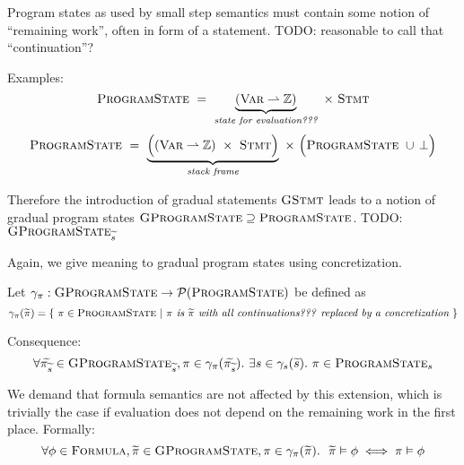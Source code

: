 Program states as used by small step semantics must contain some notion of “remaining work”, often in form of a statement.
TODO: reasonable to call that “continuation”?

Examples:
\begin{displaymath}
\textsc{ProgramState} ~=~ \underbrace{(\textsc{Var} \rightharpoonup \mathbb{Z})}_{\textit{state for evaluation???}} ~\times~ \textsc{Stmt}
\end{displaymath}
\begin{displaymath}
\textsc{ProgramState} ~=~ \underbrace{\Big((\textsc{Var} \rightharpoonup \mathbb{Z}) ~\times~ \textsc{Stmt} \Big)}_{\textit{stack frame}} ~\times~ \Big(\textsc{ProgramState} ~\cup\, \bot\Big)
\end{displaymath}

Therefore the introduction of gradual statements $\textsc{GStmt}$ leads to a notion of gradual program states $\textsc{GProgramState} \supseteq \textsc{ProgramState}$.
TODO: $\textsc{GProgramState}_{\widetilde{s}}$

Again, we give meaning to gradual program states using concretization.
\begin{definition}
    Let $\gamma_{\pi} : \textsc{GProgramState} \rightarrow \mathcal{P}(\textsc{ProgramState})$ be defined as
    \begin{displaymath}
    \gamma_{\pi}(\widetilde{\pi}) = \{~ \pi \in \textsc{ProgramState} ~|~ \textit{$\pi$ is $\widetilde{\pi}$ with all continuations??? replaced by a concretization} ~\}
    \end{displaymath}
\end{definition}

Consequence:
\begin{displaymath}
\forall \widetilde{\pi_{\widetilde{s}}} \in \textsc{GProgramState}_{\widetilde{s}}, \pi \in \gamma_{\pi}(\widetilde{\pi_{\widetilde{s}}}).~ \exists s \in \gamma_s(\widetilde{s}).~ \pi \in \textsc{ProgramState}_s
\end{displaymath}

We demand that formula semantics are not affected by this extension, which is trivially the case if evaluation does not depend on the remaining work in the first place.
Formally: $$\forall \phi \in \textsc{Formula}, \widetilde{\pi} \in \textsc{GProgramState}, \pi \in \gamma_{\pi}(\widetilde{\pi}).~~ \widetilde{\pi} \vDash \phi \iff \pi \vDash \phi$$
